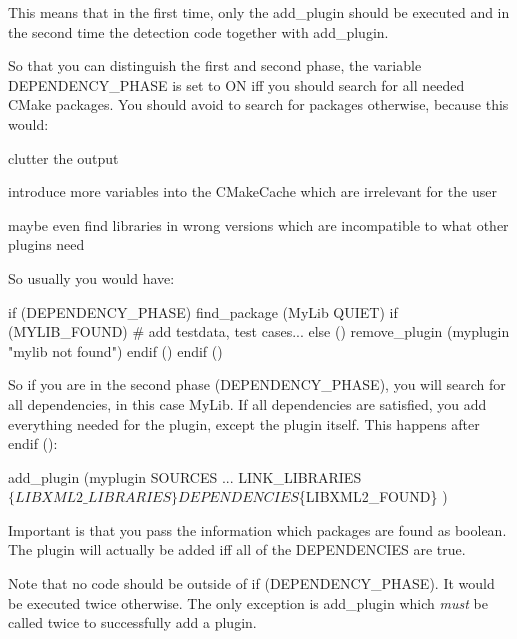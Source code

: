 This means that in the first time, only the {\ttfamily add\+\_\+plugin} should be executed and in the second time the detection code together with {\ttfamily add\+\_\+plugin}.

So that you can distinguish the first and second phase, the variable {\ttfamily D\+E\+P\+E\+N\+D\+E\+N\+C\+Y\+\_\+\+P\+H\+A\+SE} is set to {\ttfamily ON} iff you should search for all needed C\+Make packages. You should avoid to search for packages otherwise, because this would\+:


\begin{DoxyItemize}
\item clutter the output
\item introduce more variables into the {\ttfamily C\+Make\+Cache} which are irrelevant for the user
\item maybe even find libraries in wrong versions which are incompatible to what other plugins need
\end{DoxyItemize}

So usually you would have\+:


\begin{DoxyCode}
if (DEPENDENCY\_PHASE)
        find\_package (MyLib QUIET)
        if (MYLIB\_FOUND)
                # add testdata, test cases...
        else ()
                remove\_plugin (myplugin "mylib not found")
        endif ()
endif ()
\end{DoxyCode}


So if you are in the second phase ({\ttfamily D\+E\+P\+E\+N\+D\+E\+N\+C\+Y\+\_\+\+P\+H\+A\+SE}), you will search for all dependencies, in this case {\ttfamily My\+Lib}. If all dependencies are satisfied, you add everything needed for the plugin, except the plugin itself. This happens after {\ttfamily endif ()}\+:


\begin{DoxyCode}
add\_plugin (myplugin
        SOURCES
                ...
        LINK\_LIBRARIES
                $\{LIBXML2\_LIBRARIES\}
        DEPENDENCIES
                $\{LIBXML2\_FOUND\}
        )
\end{DoxyCode}


Important is that you pass the information which packages are found as boolean. The plugin will actually be added iff all of the {\ttfamily D\+E\+P\+E\+N\+D\+E\+N\+C\+I\+ES} are true.

Note that no code should be outside of {\ttfamily if (D\+E\+P\+E\+N\+D\+E\+N\+C\+Y\+\_\+\+P\+H\+A\+SE)}. It would be executed twice otherwise. The only exception is {\ttfamily add\+\_\+plugin} which {\itshape must} be called twice to successfully add a plugin.

